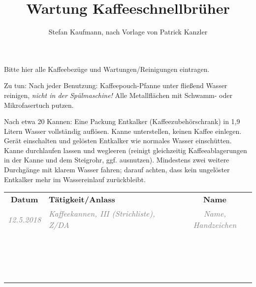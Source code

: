 \documentclass{\basedir/tph-document}
\title{Wartung Kaffeeschnellbrüher}
\author{Stefan Kaufmann, nach Vorlage von Patrick Kanzler}
\newcommand{\thickhline}{\noalign{\hrule height 2pt}}
\begin{document}
Bitte hier alle Kaffeebezüge und Wartungen/Reinigungen eintragen.

Zu tun: Nach jeder Benutzung: Kaffeepouch-Pfanne unter fließend Wasser reinigen, \emph{nicht in der Spülmaschine!} Alle Metallflächen mit Schwamm- oder Mikrofasertuch putzen.

Nach etwa 20 Kannen: Eine Packung Entkalker (Kaffeezubehörschrank) in 1,9 Litern Wasser vollständig auflösen. Kanne unterstellen, keinen Kaffee einlegen. Gerät einschalten und gelösten Entkalker wie normales Wasser einschütten. Kanne durchlaufen lassen und wegleeren (reinigt gleichzeitig Kaffeeablagerungen in der Kanne und dem Steigrohr, ggf. ausnutzen). Mindestens zwei weitere Durchgänge mit klarem Wasser fahren; darauf achten, dass kein ungelöster Entkalker mehr im Wassereinlauf zurückbleibt.

\newcommand{\bsp}[1]{\textcolor{gray}{\itshape #1}}
\newcommand{\beispielzeile}[5]{\bsp{#2} & \bsp{#3} & \bsp{#4} \\ \hline}
\newcommand{\leerzeile}{\vbox{\vspace{2.4em}} & & \\ \hline}
\vspace{-.4em}
\begin{tabularx}{\textwidth}{|c|X|c|} \hline
\bfseries Datum      &  \bfseries Tätigkeit/Anlass  & \bfseries Name \\\thickhline
\beispielzeile{BSP}{12.5.2018}{ Kaffeekannen, III (Strichliste), Z/DA }{Name, Handzeichen}
\leerzeile
\leerzeile
\leerzeile
\leerzeile
\leerzeile
\leerzeile
\leerzeile
\leerzeile
\leerzeile
\leerzeile
\leerzeile
\leerzeile
\leerzeile
\leerzeile
\leerzeile
\leerzeile
\leerzeile
\leerzeile
\end{tabularx}
\end{document}
